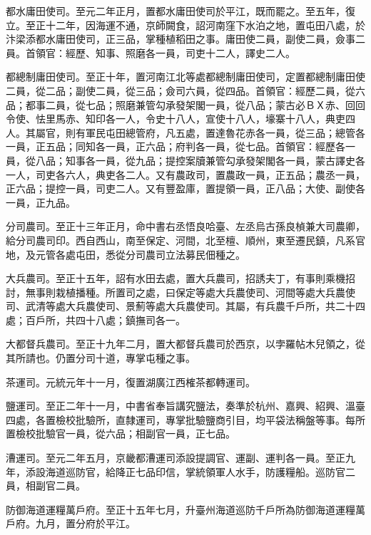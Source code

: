 \begin{pinyinscope}
 都水庸田使司。至元二年正月，置都水庸田使司於平江，既而罷之。至五年，復立。至正十二年，因海運不通，京師闕食，詔河南窪下水泊之地，置屯田八處，於汴梁添都水庸田使司，正三品，掌種植稻田之事。庸田使二員，副使二員，僉事二員。首領官：經歷、知事、照磨各一員，司吏十二人，譯史二人。



 都總制庸田使司。至正十年，置河南江北等處都總制庸田使司，定置都總制庸田使二員，從二品；副使二員，從三品；僉司六員，從四品。首領官：經歷二員，從六品；都事二員，從七品；照磨兼管勾承發架閣一員，從八品；蒙古必ＢＸ赤、回回令使、怯里馬赤、知印各一人，令史十八人，宣使十八人，壕寨十八人，典吏四人。其屬官，則有軍民屯田總管府，凡五處，置達魯花赤各一員，從三品；總管各一員，正五品；同知各一員，正六品；府判各一員，從七品。首領官：經歷各一員，從八品；知事各一員，從九品；提控案牘兼管勾承發架閣各一員，蒙古譯史各一人，司吏各六人，典吏各二人。又有農政司，置農政一員，正五品；農丞一員，正六品；提控一員，司吏二人。又有豐盈庫，置提領一員，正八品；大使、副使各一員，正九品。



 分司農司。至正十三年正月，命中書右丞悟良哈臺、左丞烏古孫良楨兼大司農卿，給分司農司印。西自西山，南至保定、河間，北至檀、順州，東至遷民鎮，凡系官地，及元管各處屯田，悉從分司農司立法募民佃種之。



 大兵農司。至正十五年，詔有水田去處，置大兵農司，招誘夫丁，有事則乘機招討，無事則栽植播種。所置司之處，曰保定等處大兵農使司、河間等處大兵農使司、武清等處大兵農使司、景薊等處大兵農使司。其屬，有兵農千戶所，共二十四處；百戶所，共四十八處；鎮撫司各一。



 大都督兵農司。至正十九年二月，置大都督兵農司於西京，以孛羅帖木兒領之，從其所請也。仍置分司十道，專掌屯種之事。



 茶運司。元統元年十一月，復置湖廣江西榷茶都轉運司。



 鹽運司。至正二年十一月，中書省奉旨講究鹽法，奏準於杭州、嘉興、紹興、溫臺四處，各置檢校批驗所，直隸運司，專掌批驗鹽商引目，均平袋法稱盤等事。每所置檢校批驗官一員，從六品；相副官一員，正七品。



 漕運司。至元二年五月，京畿都漕運司添設提調官、運副、運判各一員。至正九年，添設海道巡防官，給降正七品印信，掌統領軍人水手，防護糧船。巡防官二員，相副官二員。



 防御海道運糧萬戶府。至正十五年七月，升臺州海道巡防千戶所為防御海道運糧萬戶府。九月，置分府於平江。




\end{pinyinscope}
